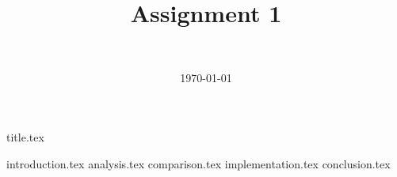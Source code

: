 \documentclass[final]{article}
\title{Assignment 1}
\author{~}
\date{\today}
\begin{document}

{title.tex}
\newpage
\tableofcontents

\newpage
{}
{introduction.tex}
\newpage
{analysis.tex}
{comparison.tex}
{implementation.tex}
{conclusion.tex}

\end{document}
